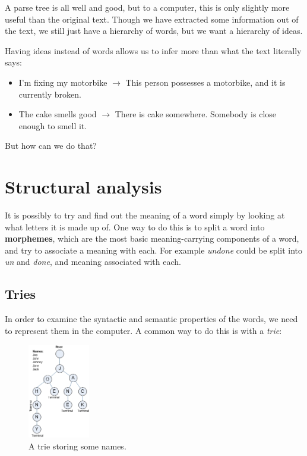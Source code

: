 A parse tree is all well and good, but to a computer, this is only slightly more
useful than the original text. Though we have extracted some information out of
the text, we still just have a hierarchy of words, but we want a hierarchy of
ideas.

Having ideas instead of words allows us to infer more than what the text
literally says:

\begin{itemize}
  \item I'm fixing my motorbike $\rightarrow$ This person possesses a
  motorbike, and it is currently broken.
  \item The cake smells good $\rightarrow$ There is cake somewhere. Somebody is
  close enough to smell it.
\end{itemize}

But how can we do that?

\section{Structural analysis}

It is possibly to try and find out the meaning of a word simply by looking at
what letters it is made up of. One way to do this is to split a word into
\textbf{morphemes}, which are the most basic meaning-carrying components of a
word, and try to associate a meaning with each. For example \textit{undone}
could be split into \textit{un} and \textit{done}, and meaning associated with
each.

\subsection{Tries}


In order to examine the syntactic and semantic properties of the words, we need
to represent them in the computer. A common way to do this is with a
\textit{trie}:

\begin{figure}
  \begin{center}
    \includegraphics[width=0.24\textwidth,keepaspectratio]{images/trie}
  \end{center}
  \caption{A trie storing some names.}
\end{figure}

